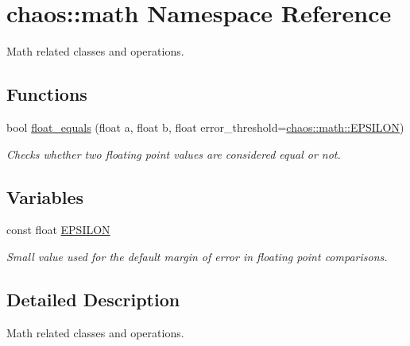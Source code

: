 \hypertarget{namespacechaos_1_1math}{\section{chaos\-:\-:math Namespace Reference}
\label{namespacechaos_1_1math}
}


Math related classes and operations.  


\subsection*{Functions}
\begin{DoxyCompactItemize}
\item 
bool \hyperlink{namespacechaos_1_1math_a8cdea3a2be1387d86833df4e8ca1d8f9}{float\-\_\-equals} (float a, float b, float error\-\_\-threshold=\hyperlink{namespacechaos_1_1math_a592b0721bd50c7f638c5f09d6db661fe}{chaos\-::math\-::\-E\-P\-S\-I\-L\-O\-N})
\begin{DoxyCompactList}\small\item\em Checks whether two floating point values are considered equal or not. \end{DoxyCompactList}\end{DoxyCompactItemize}
\subsection*{Variables}
\begin{DoxyCompactItemize}
\item 
\hypertarget{namespacechaos_1_1math_a592b0721bd50c7f638c5f09d6db661fe}{const float \hyperlink{namespacechaos_1_1math_a592b0721bd50c7f638c5f09d6db661fe}{E\-P\-S\-I\-L\-O\-N}}\label{namespacechaos_1_1math_a592b0721bd50c7f638c5f09d6db661fe}

\begin{DoxyCompactList}\small\item\em Small value used for the default margin of error in floating point comparisons. \end{DoxyCompactList}\end{DoxyCompactItemize}


\subsection{Detailed Description}
Math related classes and operations. 

